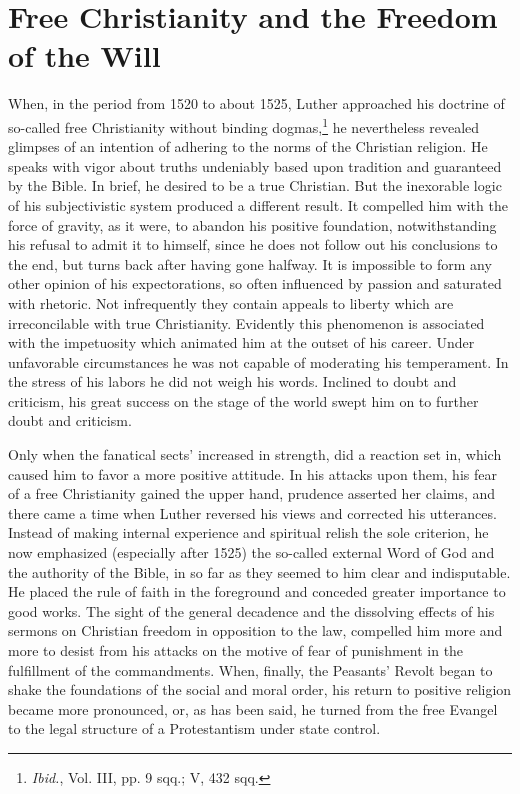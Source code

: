 \section{Free Christianity and the Freedom of the Will}

When, in the period from 1520 to about 1525, Luther approached
his doctrine of so-called free Christianity without binding dogmas,\footnote
{\textit{Ibid.}, Vol. III, pp. 9 sqq.; V, 432 sqq.}
he nevertheless revealed glimpses of an intention of adhering to
the norms of the Christian religion. He speaks with vigor about
truths undeniably based upon tradition and guaranteed by the Bible.
In brief, he desired to be a true Christian. But the inexorable logic
of his subjectivistic system produced a different result. It compelled
him with the force of gravity, as it were, to abandon his positive
foundation, notwithstanding his refusal to admit it to himself, since
he does not follow out his conclusions to the end, but turns back
after having gone halfway. It is impossible to form any other
opinion of his expectorations, so often influenced by passion and
saturated with rhetoric. Not infrequently they contain appeals to
liberty which are irreconcilable with true Christianity. Evidently
this phenomenon is associated with the impetuosity which animated
him at the outset of his career. Under unfavorable circumstances
he was not capable of moderating his temperament. In the stress of
his labors he did not weigh his words. Inclined to doubt and criticism,
his great success on the stage of the world swept him on to further
doubt and criticism.

Only when the fanatical sects' increased in strength, did a reaction
set in, which caused him to favor a more positive attitude.
In his attacks upon them, his fear of a free Christianity gained the
upper hand, prudence asserted her claims, and there came a time
when Luther reversed his views and corrected his utterances. Instead
of making internal experience and spiritual relish the sole
criterion, he now emphasized (especially after 1525) the so-called
external Word of God and the authority of the Bible, in so far
as they seemed to him clear and indisputable. He placed the rule of
faith in the foreground and conceded greater importance to good
works. The sight of the general decadence and the dissolving effects
of his sermons on Christian freedom in opposition to the law, compelled
him more and more to desist from his attacks on the motive
of fear of punishment in the fulfillment of the commandments.
When, finally, the Peasants’ Revolt began to shake the foundations of
the social and moral order, his return to positive religion became more
pronounced, or, as has been said, he turned from the free Evangel
to the legal structure of a Protestantism under state control.

